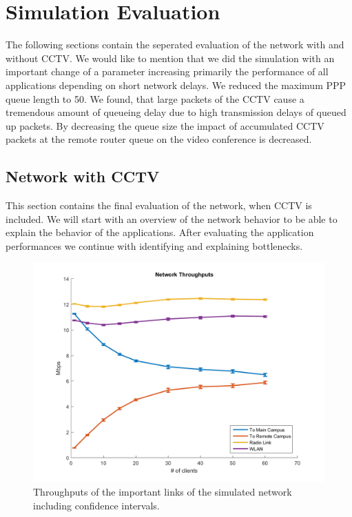 \documentclass[
10pt, %
a4paper, %
oneside, %
headinclude,footinclude, %
BCOR5mm, %
]{scrartcl}
\begin{document}
\section{Simulation Evaluation}
The following sections contain the seperated evaluation of the network with and without CCTV.
We would like to mention that we did the simulation with an important change of a parameter increasing primarily the performance of all applications depending on short network delays. We reduced the maximum PPP queue length to 50. We found, that large packets of the CCTV cause a tremendous amount of queueing delay due to high transmission delays of queued up packets. By decreasing the queue size the impact of accumulated CCTV packets at the remote router queue on the video conference is decreased.

\subsection{Network with CCTV}
This section contains the final evaluation of the network, when CCTV is included. We will start with an overview of the network behavior to be able to explain the behavior of the applications. After evaluating the application performances we continue with identifying and explaining bottlenecks.
\begin{figure}[!ht]
  \centering
  \includegraphics[width=\textwidth]{Figures/cctv_network_throughputs.png}
  \caption{Throughputs of the important links of the simulated network including confidence intervals.} \label{fig:cctv_network_throughputs}
\end{figure}
\end{document}
